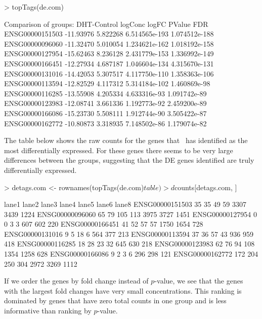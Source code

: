 \begin{Schunk}
\begin{Sinput}
> topTags(de.com)
\end{Sinput}
\begin{Soutput}
Comparison of groups: DHT-Control 
                  logConc    logFC        PValue           FDR
ENSG00000151503 -11.93976 5.822268 6.514565e-193 1.074512e-188
ENSG00000096060 -11.32470 5.010054 1.234621e-162 1.018192e-158
ENSG00000127954 -15.62463 8.236128 2.431779e-153 1.336992e-149
ENSG00000166451 -12.27934 4.687187 1.046604e-134 4.315670e-131
ENSG00000131016 -14.42053 5.307517 4.117750e-110 1.358363e-106
ENSG00000113594 -12.82529 4.117312 5.314184e-102  1.460869e-98
ENSG00000116285 -13.55908 4.205334  4.633316e-93  1.091742e-89
ENSG00000123983 -12.08741 3.661336  1.192773e-92  2.459200e-89
ENSG00000166086 -15.23730 5.508111  1.912744e-90  3.505422e-87
ENSG00000162772 -10.80873 3.318935  7.148502e-86  1.179074e-82
\end{Soutput}
\end{Schunk}

The table below shows the raw counts for the genes that \edgeR~has
identified as the most differentially expressed. For these genes there
seems to be very large differences between the groups, suggesting that
the DE genes identified are truly differentially expressed.

\begin{Schunk}
\begin{Sinput}
> detags.com <- rownames(topTags(de.com)$table)
> d$counts[detags.com, ]
\end{Sinput}
\begin{Soutput}
                lane1 lane2 lane3 lane4 lane5 lane6 lane8
ENSG00000151503    35    35    49    59  3307  3439  1224
ENSG00000096060    65    79   105   113  3975  3727  1451
ENSG00000127954     0     0     3     3   607   602   220
ENSG00000166451    41    52    57    57  1750  1654   728
ENSG00000131016     9     5    18     6   564   377   213
ENSG00000113594    37    36    57    43   936   959   418
ENSG00000116285    18    28    23    32   645   630   218
ENSG00000123983    62    76    94   108  1354  1258   628
ENSG00000166086     9     2     3     6   296   298   121
ENSG00000162772   172   204   250   304  2972  3269  1112
\end{Soutput}
\end{Schunk}

If we order the genes by fold change instead of $p$-value, we see that
the genes with the largest fold changes have very small
concentrations. This ranking is dominated by genes that have zero
total counts in one group and is less informative than ranking by
$p$-value.

